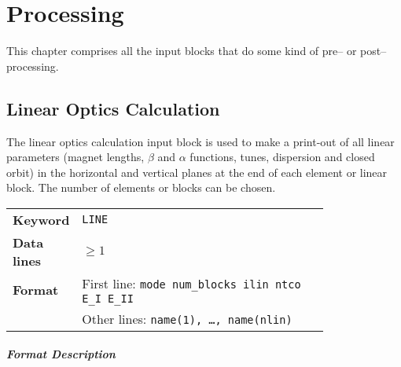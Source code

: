 
\chapter{Processing} \label{Proc}

This chapter comprises all the input blocks that do some kind of pre-- or post--processing.

\section{Linear Optics Calculation} \label{LinOpt}

The linear optics calculation input block is used to make a print-out of all linear parameters (magnet lengths, $\beta$ and $\alpha$ functions, tunes, dispersion and closed orbit) in the horizontal and vertical planes at the end of each element or linear block.
The number of elements or blocks can be chosen.

\bigskip
\begin{tabular}{@{}lp{0.8\linewidth}}
    \textbf{Keyword}    & \texttt{LINE} \\
    \textbf{Data lines} & $\geq 1$ \\
    \textbf{Format}     & First line: \texttt{mode num\_blocks ilin ntco E\_I E\_II} \\
                        & Other lines: \texttt{name(1), \dots , name(nlin)}
\end{tabular}

\paragraph{Format Description}~

